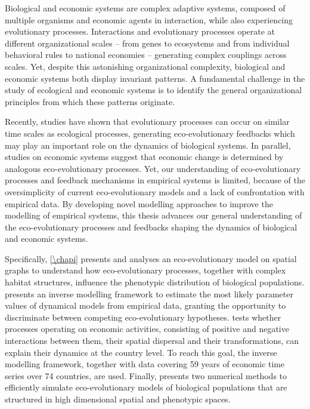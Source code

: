 %
\label{sec:summary}
\small{
    Biological and economic systems are complex adaptive systems, composed of multiple organisms and economic agents in interaction, while also experiencing evolutionary processes. Interactions and evolutionary processes operate at different organizational scales -- from genes to ecosystems and from individual behavioral rules to national economies -- generating complex couplings across scales. Yet, despite this astonishing organizational complexity, biological and economic systems both display invariant patterns. A fundamental challenge in the study of ecological and economic systems is to identify the general organizational principles from which these patterns originate.

    Recently, studies have shown that evolutionary processes can occur on similar time scales as ecological processes, generating eco-evolutionary feedbacks which may play an important role on the dynamics of biological systems. In parallel, studies on economic systems suggest that economic change is determined by analogous eco-evolutionary processes. Yet, our understanding of eco-evolutionary processes and feedback mechanisms in empirical systems is limited, because of the oversimplicity of current eco-evolutionary models and a lack of confrontation with empirical data. By developing novel modelling approaches to improve the modelling of empirical systems, this thesis advances our general understanding of the eco-evolutionary processes and feedbacks shaping the dynamics of biological and economic systems.
    
    Specifically, \cref{\chapi} presents and analyses an eco-evolutionary model on spatial graphs to understand how eco-evolutionary processes, together with complex habitat structures, influence the phenotypic distribution of biological populations. \Cref{\chapii} presents an inverse modelling framework to estimate the most likely parameter values of dynamical models from empirical data, granting the opportunity to discriminate between competing eco-evolutionary hypotheses. \Cref{\chapiv} tests whether processes operating on economic activities, consisting of positive and negative interactions between them, their spatial dispersal and their transformations, can explain their dynamics at the country level. To reach this goal, the inverse modelling framework, together with data covering 59 years of economic time series over 74 countries, are used. Finally, \Cref{\chapiv} presents two numerical methods to efficiently simulate eco-evolutionary models of biological populations that are structured in high dimensional spatial and phenotypic spaces.
    
}
